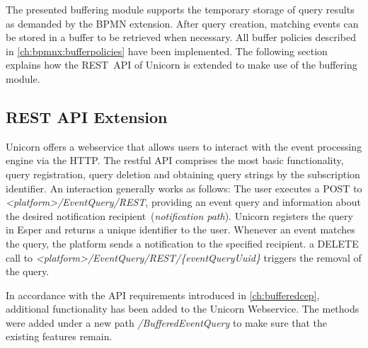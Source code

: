 The presented buffering module supports the temporary storage of query results as demanded by the BPMN extension. After query creation, matching events can be stored in a buffer to be retrieved when necessary.
All buffer policies described in \autoref{ch:bpmnx:bufferpolicies} have been implemented.
The following section explains how the \acs{REST}~\acs{API} of Unicorn is extended to make use of the buffering module.

\subsection{REST API Extension}\label{ch:impl:unicorn-api}
Unicorn offers a webservice that allows users to interact with the event processing engine via the \ac{HTTP}.
The restful API comprises the most basic functionality, query registration, query deletion and obtaining query strings by the subscription identifier.
An interaction generally works as follows: The user executes a POST to \textit{<platform>/EventQuery/REST}, providing an event query and information about the desired notification recipient~(\textit{notification path}). Unicorn registers the query in Esper and returns a unique identifier to the user.
Whenever an event matches the query, the platform sends a notification to the specified recipient. a DELETE call to \textit{<platform>/EventQuery/REST/\{eventQueryUuid\}} triggers the removal of the query.

In accordance with the API requirements introduced in \autoref{ch:bufferedcep}, additional functionality has been added to the Unicorn Webservice.
The methods were added under a new path \textit{/BufferedEventQuery} to make sure that the existing features remain.\\

\pagebreak


